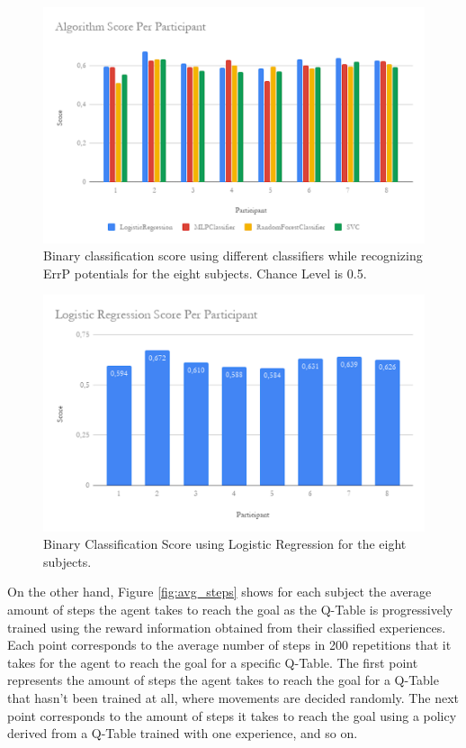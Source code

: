 \documentclass[journal]{IEEEtran}
\begin{document}
{{\begin{figure}[ht]
    \centering
    \includegraphics[scale=0.4]{Images/algorithm_calibration/Total_calib.png}
    \caption{Binary classification score using different classifiers while recognizing ErrP potentials for the eight subjects.  Chance Level is 0.5.}
    \label{fig:classifiers}
\end{figure}

\begin{figure}[ht]
    \centering
    \includegraphics[scale=0.4]{Images/algorithm_calibration/LR_calib.png}
    \caption{Binary Classification Score using Logistic Regression for the eight subjects.}
    \label{fig:logisticregression}
\end{figure}

On the other hand, Figure \ref{fig:avg_steps} shows for each subject the average amount of steps the agent takes to reach the goal as the Q-Table is progressively trained using the reward information obtained from their classified experiences. Each point corresponds to the average number of steps in 200 repetitions that it takes for the agent to reach the goal for a specific Q-Table. The first point represents the amount of steps the agent takes to reach the goal for a Q-Table that hasn't been trained at all, where movements are decided randomly. The next point corresponds to the amount of steps it takes to reach the goal using a policy derived from a Q-Table trained with one experience, and so on.

}}
\end{document}
